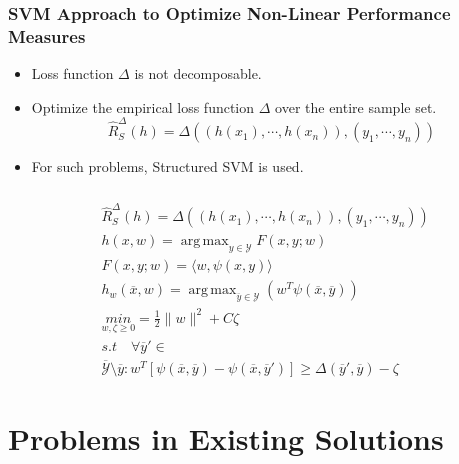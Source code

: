 \documentclass{beamer}
\DeclareMathOperator*{\argmax}{arg\,max}
\begin{document}

\begin{frame}
	\frametitle{SVM Approach to Optimize Non-Linear Performance Measures}
	\begin{itemize}
		\item Loss function $\Delta$ is not decomposable.
		\item Optimize the empirical loss function $\Delta$ over the entire sample set.
		\begin{equation*}
		\hat{R}_S^\Delta(h) = \Delta ((h(x_1), \cdots, h(x_n)), (y_1, \cdots, y_n))
		\end{equation*}
		\item For such problems, Structured SVM is used.
	\end{itemize}
\end{frame}


\begin{frame}
	\frametitle{}
	\begin{equation*}
	\begin{split}
		& \hat{R}_S^\Delta(h) = \Delta ((h(x_1), \cdots, h(x_n)), (y_1, \cdots, y_n))\\
		& h(x,w) = \argmax_{y\in\mathcal{Y}}F(x,y;w)\\
		& F(x,y;w)=\langle w,\psi(x,y)\rangle\\
		& h_w(\overline{x},w)=\argmax_{\overline{y}\in\mathcal{Y}}(w^T\psi({\overline{x},\overline{y}}))\\
		& \underset{w,\zeta \geq 0}{min}= \frac{1}{2}\|w\|^2+C\zeta\\
		& s.t \quad \forall\overline{y}' \in\\
		& \overline{\mathcal{Y}}\setminus\overline{y}:w^T[\psi(\overline{x},\overline{y})- \psi(\overline{x},\overline{y}')]\geq \Delta(\overline{y}',\overline{y})-\zeta
	\end{split}
	\end{equation*}
\end{frame}


\section{Problems in Existing Solutions} %
\end{document}
